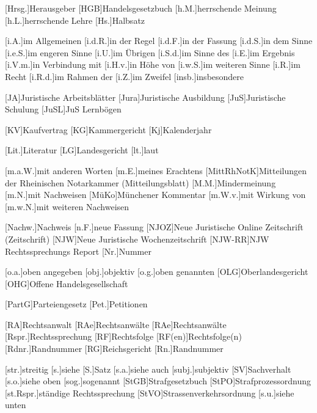 \begin{acronym}[MittRhNotK]
[Hrsg.]{Herausgeber}
[HGB]{Handelsgesetzbuch}
[h.M.]{herrschende Meinung}
[h.L.]{herrschende Lehre}
[Hs.]{Halbsatz}

[i.A.]{im Allgemeinen}
[i.d.R.]{in der Regel}
[i.d.F.]{in der Fassung}
[i.d.S.]{in dem Sinne}
[i.e.S.]{im engeren Sinne}
[i.U.]{im Übrigen}
[i.S.d.]{im Sinne des}
[i.E.]{im Ergebnis}
[i.V.m.]{in Verbindung mit}
[i.H.v.]{in Höhe von}
[i.w.S.]{im weiteren Sinne}
[i.R.]{im Recht}
[i.R.d.]{im Rahmen der}
[i.Z.]{im Zweifel}
[insb.]{insbesondere}

[JA]{Juristische Arbeitsblätter}
[Jura]{Juristische Ausbildung}
[JuS]{Juristische Schulung}
[JuSL]{JuS Lernbögen}

[KV]{Kaufvertrag}
[KG]{Kammergericht}
[Kj]{Kalenderjahr}

[Lit.]{Literatur}
[LG]{Landesgericht}
[lt.]{laut}

[m.a.W.]{mit anderen Worten}
[m.E.]{meines Erachtens}
[MittRhNotK]{Mitteilungen der Rheinischen Notarkammer (Mitteilungsblatt)}
[M.M.]{Mindermeinung}
[m.N.]{mit Nachweisen}
[MüKo]{Münchener Kommentar}
[m.W.v.]{mit Wirkung von}
[m.w.N.]{mit weiteren Nachweisen}

[Nachw.]{Nachweis}
[n.F.]{neue Fassung}
[NJOZ]{Neue Juristische Online Zeitschrift (Zeitschrift)}
[NJW]{Neue Juristische Wochenzeitschrift}
[NJW-RR]{NJW Rechtssprechungs Report}
[Nr.]{Nummer}

[o.a.]{oben angegeben}
[obj.]{objektiv}
[o.g.]{oben genannten}
[OLG]{Oberlandesgericht}
[OHG]{Offene Handelsgesellschaft}

[PartG]{Parteiengesetz}
[Pet.]{Petitionen}

[RA]{Rechtsanwalt}
[RAe]{Rechtsanwälte}
[RAe]{Rechtsanwälte}
[Rspr.]{Rechtssprechung}
[RF]{Rechtsfolge}
[RF(en)]{Rechtsfolge(n)}
[Rdnr.]{Randnummer}
[RG]{Reichsgericht}
[Rn.]{Randnummer}

[str.]{streitig}
[s.]{siehe}
[S.]{Satz}
[s.a.]{siehe auch}
[subj.]{subjektiv}
[SV]{Sachverhalt}
[s.o.]{siehe oben}
[sog.]{sogenannt}
[StGB]{Strafgesetzbuch}
[StPO]{Strafprozessordnung}
[st.Rspr.]{ständige Rechtssprechung}
[StVO]{Strassenverkehrsordnung}
[s.u.]{siehe unten}


\end{acronym}
